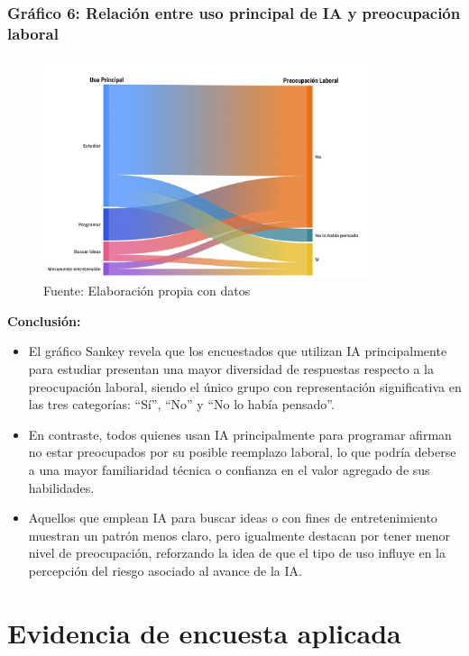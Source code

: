 \documentclass[12pt, a4paper]{article}
\begin{document}
\subsubsection*{Gráfico 6: Relación entre uso principal de IA y preocupación laboral}
\begin{figure}[H]
    \centering
    \includegraphics[width=0.85\textwidth]{Graficos/UsoPrincipalVSPreocupacionLaboral.jpg}
    \caption[6]{Fuente: Elaboración propia con datos}

\end{figure}


\textbf{Conclusión:}  
\begin{itemize}
    \item El gráfico Sankey revela que los encuestados que utilizan IA principalmente para estudiar presentan una mayor diversidad de respuestas respecto a la preocupación laboral, siendo el único grupo con representación significativa en las tres categorías: “Sí”, “No” y “No lo había pensado”.
    \item En contraste, todos quienes usan IA principalmente para programar afirman no estar preocupados por su posible reemplazo laboral, lo que podría deberse a una mayor familiaridad técnica o confianza en el valor agregado de sus habilidades.
    \item Aquellos que emplean IA para buscar ideas o con fines de entretenimiento muestran un patrón menos claro, pero igualmente destacan por tener menor nivel de preocupación, reforzando la idea de que el tipo de uso influye en la percepción del riesgo asociado al avance de la IA.

\end{itemize}

\section{Evidencia de encuesta aplicada}
\end{document}

